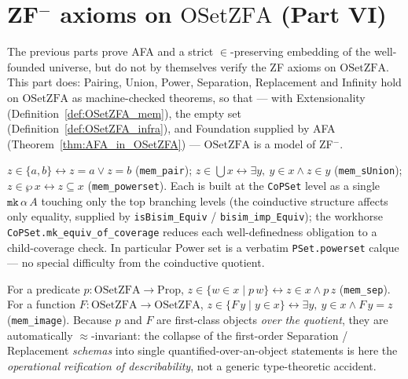 \section{ZF$^-$ axioms on $\mathrm{OSetZFA}$ (Part VI)}
\label{sec:setszfa_zf}

The previous parts prove AFA and a strict $\in$-preserving embedding of the
well-founded universe, but do not by themselves verify the ZF axioms on
$\mathrm{OSetZFA}$.  This part does: Pairing, Union, Power, Separation,
Replacement and Infinity hold on $\mathrm{OSetZFA}$ as machine-checked theorems,
so that --- with Extensionality (Definition~\ref{def:OSetZFA_mem}), the empty set
(Definition~\ref{def:OSetZFA_infra}), and Foundation supplied by AFA
(Theorem~\ref{thm:AFA_in_OSetZFA}) --- $\mathrm{OSetZFA}$ is a model of ZF$^-$.

\begin{theorem}
\label{thm:setszfa_zf1}
\leanok
{}
$z \in \{a,b\} \leftrightarrow z = a \vee z = b$ (\texttt{mem\_pair});
$z \in \bigcup x \leftrightarrow \exists y,\ y \in x \wedge z \in y$
(\texttt{mem\_sUnion}); $z \in \wp\,x \leftrightarrow z \subseteq x$
(\texttt{mem\_powerset}).  Each is built at the \texttt{CoPSet} level as a single
$\texttt{mk}\,\alpha\,A$ touching only the top branching levels (the coinductive
structure affects only equality, supplied by \texttt{isBisim\_Equiv} /
\texttt{bisim\_imp\_Equiv}); the workhorse
\texttt{CoPSet.mk\_equiv\_of\_coverage} reduces each well-definedness obligation
to a child-coverage check.  In particular Power set is a verbatim
\texttt{PSet.powerset} calque --- no special difficulty from the coinductive
quotient.
\end{theorem}

\begin{theorem}
\label{thm:setszfa_zf2}
\leanok
{}
For a predicate $p : \mathrm{OSetZFA} \to \mathrm{Prop}$,
$z \in \{w \in x \mid p\,w\} \leftrightarrow z \in x \wedge p\,z$
(\texttt{mem\_sep}).  For a function $F : \mathrm{OSetZFA} \to \mathrm{OSetZFA}$,
$z \in \{F\,y \mid y \in x\} \leftrightarrow \exists y,\ y \in x \wedge F\,y = z$
(\texttt{mem\_image}).  Because $p$ and $F$ are first-class objects \emph{over
the quotient}, they are automatically $\approx$-invariant: the collapse of the
first-order Separation / Replacement \emph{schemas} into single
quantified-over-an-object statements is here the \emph{operational reification of
describability}, not a generic type-theoretic accident.
\end{theorem}

